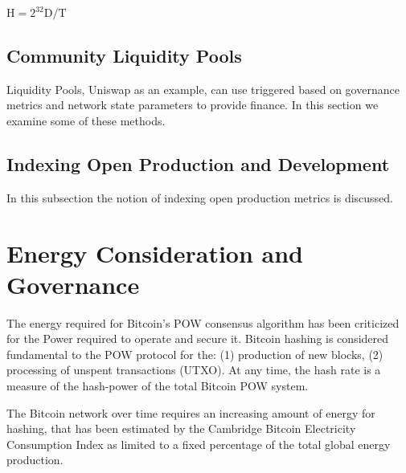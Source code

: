 \documentclass[final,5p,times,twocolumn,authoryear]{elsarticle}
\begin{document}
$\textrm{H} = 2^{32} \textrm{D} / \textrm{T}$\\

\subsection{Community Liquidity Pools}
Liquidity Pools, Uniswap as an example, can use triggered based on governance metrics and network state parameters to provide finance. In this section we examine some of these methods.


\subsection{Indexing Open Production and Development}
In this subsection the notion of indexing open production metrics is discussed.

\section{Energy Consideration and Governance}
\label{sec:btc4}

The energy required for Bitcoin's POW consensus algorithm has been criticized for the Power required to operate and secure it. Bitcoin hashing is considered fundamental to the POW protocol for the: (1) production of new blocks, (2) processing of unspent transactions (UTXO). At any time, the hash rate is a measure of the hash-power of the total Bitcoin POW system. 

The Bitcoin network over time requires an increasing amount of energy for hashing, that has been estimated by the Cambridge Bitcoin Electricity Consumption Index as limited to a fixed percentage of the total global energy production. 
\end{document}
